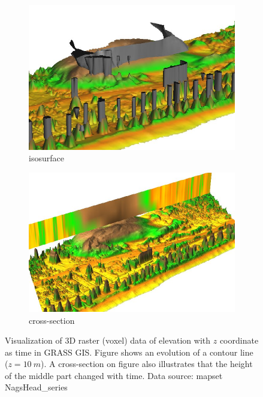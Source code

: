 \documentclass[a4paper,12pt,oneside]{book}
\begin{document}
\begin{figure}[ht!]
\centering
    \begin{subfigure}[ht]{0.49\textwidth}
    \centering
        \includegraphics[width=\textwidth]{./images/nviz_isosurface.jpg}
    \caption{isosurface}
    \label{fig:nviz_isosurface}
    \end{subfigure}
    \begin{subfigure}[ht]{0.49\textwidth}
    \centering
        \includegraphics[width=\textwidth]{./images/nviz_slices.jpg}
    \caption{cross-section}
    \label{fig:nviz_slices}
    \end{subfigure}
\caption[Visualization of 3D raster (voxel) data of elevation with $z$ coordinate as time in GRASS GIS]
{Visualization of 3D raster (voxel) data of elevation with $z$ coordinate as time in GRASS GIS.
Figure  shows an evolution of a contour line ($z=10\ m$).
A cross-section on figure  also illustrates that the height of the middle
part changed with time.
Data source: mapset NagsHead\_series}

\label{fig:nviz_voxel}
\end{figure}
\end{document}
